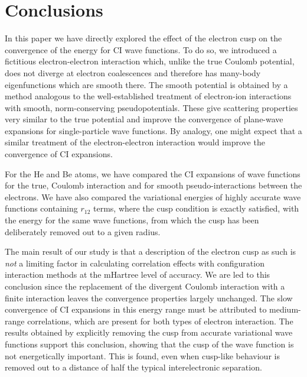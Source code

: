 \section{Conclusions}


In this paper we have directly explored the effect of the electron 
cusp on the convergence of the energy for CI wave functions.
To do so, we introduced a fictitious electron-electron interaction 
which, unlike the true Coulomb potential, does not diverge at 
electron coalescences and therefore has many-body eigenfunctions 
which are smooth there.
The smooth potential is obtained by a method analogous to the 
well-established treatment of electron-ion interactions with smooth, 
norm-conserving pseudopotentials. 
These give scattering properties
very similar to the true potential and improve the convergence 
of plane-wave expansions for single-particle wave functions.
By analogy, one might expect that a similar treatment of the
electron-electron interaction would improve the convergence
of CI expansions.

For the He and Be atoms, we have compared the CI expansions of 
wave functions for the true, Coulomb interaction and for smooth
pseudo-interactions between the electrons.
We have also compared the variational energies of highly accurate
wave functions containing $r_{12}$ terms, where the cusp condition 
is exactly satisfied, with the energy for the same wave functions, 
from which the cusp has been deliberately removed out to a given radius.

The main result of our study is that a description of the electron 
cusp as such is {\it not} a limiting factor in calculating correlation 
effects with configuration interaction methods at the mHartree 
level of accuracy.
We are led to this conclusion since the replacement of the divergent 
Coulomb interaction with a finite interaction leaves the convergence 
properties largely unchanged. 
The slow convergence of CI expansions in this energy range must be 
attributed to medium-range correlations, which are present for both
types of electron interaction. 
The results obtained by explicitly removing the cusp from 
accurate variational wave functions support this conclusion,
showing that the cusp of the wave function is not energetically 
important. 
This is found, even when cusp-like behaviour is removed out to 
a distance of half the typical interelectronic separation.

